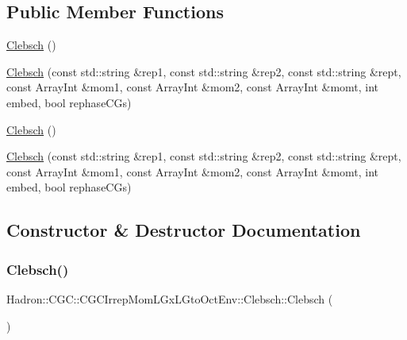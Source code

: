 \subsection*{Public Member Functions}
\begin{DoxyCompactItemize}
\item 
\mbox{\hyperlink{classHadron_1_1CGC_1_1CGCIrrepMomLGxLGtoOctEnv_1_1Clebsch_a3d2708b7f0e34831c30e5c1e6d401c5b}{Clebsch}} ()
\item 
\mbox{\hyperlink{classHadron_1_1CGC_1_1CGCIrrepMomLGxLGtoOctEnv_1_1Clebsch_ad45db603e49894fc27cb00dd494fb286}{Clebsch}} (const std\+::string \&rep1, const std\+::string \&rep2, const std\+::string \&rept, const Array\+Int \&mom1, const Array\+Int \&mom2, const Array\+Int \&momt, int embed, bool rephase\+C\+Gs)
\item 
\mbox{\hyperlink{classHadron_1_1CGC_1_1CGCIrrepMomLGxLGtoOctEnv_1_1Clebsch_a3d2708b7f0e34831c30e5c1e6d401c5b}{Clebsch}} ()
\item 
\mbox{\hyperlink{classHadron_1_1CGC_1_1CGCIrrepMomLGxLGtoOctEnv_1_1Clebsch_ad45db603e49894fc27cb00dd494fb286}{Clebsch}} (const std\+::string \&rep1, const std\+::string \&rep2, const std\+::string \&rept, const Array\+Int \&mom1, const Array\+Int \&mom2, const Array\+Int \&momt, int embed, bool rephase\+C\+Gs)
\end{DoxyCompactItemize}


\subsection{Constructor \& Destructor Documentation}
\mbox{\label{classHadron_1_1CGC_1_1CGCIrrepMomLGxLGtoOctEnv_1_1Clebsch_a3d2708b7f0e34831c30e5c1e6d401c5b}} 
\subsubsection{\texorpdfstring{Clebsch()}{Clebsch()}\hspace{0.1cm}{\footnotesize\ttfamily [1/4]}}
{\footnotesize\ttfamily Hadron\+::\+C\+G\+C\+::\+C\+G\+C\+Irrep\+Mom\+L\+Gx\+L\+Gto\+Oct\+Env\+::\+Clebsch\+::\+Clebsch (\begin{DoxyParamCaption}{ }\end{DoxyParamCaption})\hspace{0.3cm}{\ttfamily [inline]}}


